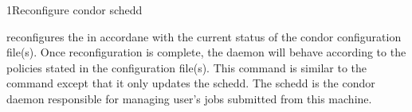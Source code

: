 \begin{ManPage}{}{1}{Reconfigure condor schedd}
\label{man-condor-reconfig-schedd}
\Synopsis {}

\Description 

 reconfigures the  in accordane with 
the current
status of the condor configuration file(s).  Once reconfiguration is complete,
the daemon will behave according to the policies stated in the configuration
file(s).  This command is similar to the  command except that
it only updates the schedd.  The schedd is the condor daemon responsible for
managing user's jobs submitted from this machine.  


\begin{Options}
\end{Options}

\end{ManPage}
